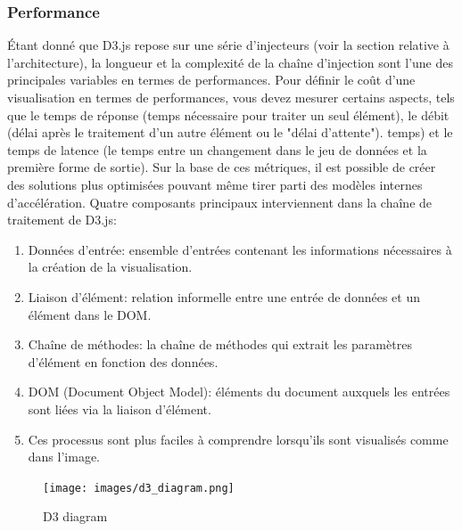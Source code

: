 \documentclass[french, a4paper, 12pt]{report}
\begin{document}
\subsubsection{Performance}
Étant donné que D3.js repose sur une série d’injecteurs (voir la section relative à l’architecture), la longueur et la complexité de la chaîne d’injection sont l’une des principales variables en termes de performances. Pour définir le coût d'une visualisation en termes de performances, vous devez mesurer certains aspects, tels que le temps de réponse (temps nécessaire pour traiter un seul élément), le débit (délai après le traitement d'un autre élément ou le "délai d'attente"). temps) et le temps de latence (le temps entre un changement dans le jeu de données et la première forme de sortie). Sur la base de ces métriques, il est possible de créer des solutions plus optimisées pouvant même tirer parti des modèles internes d’accélération.
Quatre composants principaux interviennent dans la chaîne de traitement de D3.js:
\begin{enumerate}
    \item Données d'entrée: ensemble d'entrées contenant les informations nécessaires à la création de la visualisation.
    \item Liaison d'élément: relation informelle entre une entrée de données et un élément dans le DOM.
    \item Chaîne de méthodes: la chaîne de méthodes qui extrait les paramètres d'élément en fonction des données.
    \item DOM (Document Object Model): éléments du document auxquels les entrées sont liées via la liaison d'élément.
    \item Ces processus sont plus faciles à comprendre lorsqu’ils sont visualisés comme dans l’image.
    
\end{enumerate}
\begin{figure}[!htp]
    \centering
    \texttt{[image: images/d3\_diagram.png]}
    \caption{D3 diagram}
    \label{fig:2.16}
\end{figure}
\end{document}

